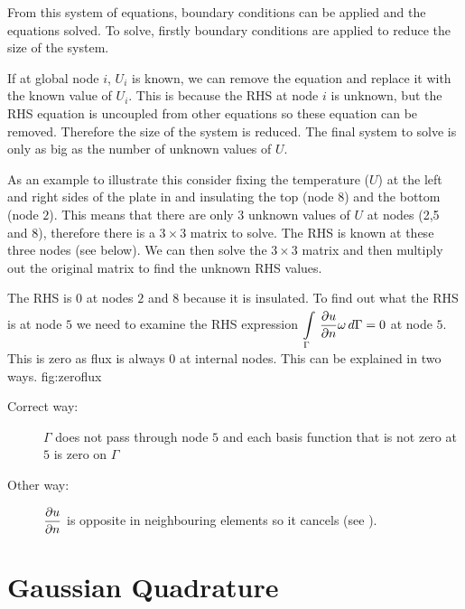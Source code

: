 From this system of equations, boundary conditions can be applied and the
equations solved. To solve, firstly boundary conditions are applied to reduce
the size of the system.

If at global node $i$, $U_{i}$ is known, we can remove the  equation
and replace it with the known value of $U_{i}$. This is because the RHS at
node $i$ is unknown, but the RHS equation is uncoupled from other equations so these
equation can be removed.
Therefore the size of the system is reduced. The final system to solve is only
as big as the number of unknown values of $U$. 

As an example to illustrate this consider fixing the temperature ($U$) at the
left and right sides of the plate in  and insulating the top (node
 $8$) and the bottom (node $2$). 
This means that there are only $3$ unknown values of $U$ at nodes (2,5 and 8), 
therefore there is a $3 \times 3$ matrix to solve. The RHS is known at these
three nodes (see below). We can then solve the $3 \times 3$ matrix and then multiply out
the original matrix to find the unknown RHS values.

The RHS is $0$ at nodes $2$ and $8$ because it is insulated.
To find out what the RHS is at node $5$ we need to examine the RHS expression
 $   \displaystyle\int\limits_{\Gamma}^{} \, \dfrac{\partial u}{\partial n} \omega\,d\Gamma   = 0$ at node $5$. This is zero as flux is always $0$ at
internal nodes. This can be explained in two ways.
   {fig:zeroflux} 
\begin{description}
   \item [Correct way:] $\Gamma$ does not pass through node $5$ and each
     basis function that is
     not zero at $5$ is zero on $\Gamma$
   \item [Other way:] $ \dfrac{\partial u}{\partial n} $ is opposite in neighbouring elements so
     it cancels (see ).
\end{description}



\section{Gaussian Quadrature}
\label{sec:Gquad}

